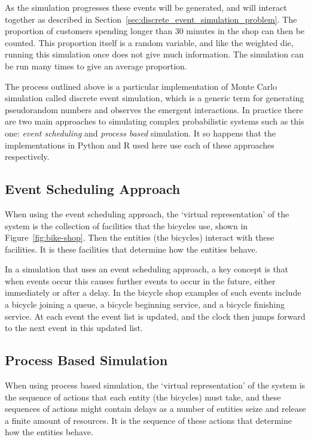 As the simulation progresses these events will be generated, and will interact
together as described in Section~\ref{sec:discrete_event_simulation_problem}.
The proportion of customers spending longer than 30 minutes in the shop can then
be counted. This proportion itself is a random variable, and like the
weighted die, running this simulation once does not give much information.
The simulation can be run many times to give an average proportion.

The process outlined above is a particular implementation of Monte Carlo
simulation called discrete event simulation, which is a generic term
for generating pseudorandom numbers and observes the emergent interactions. In
practice there are two main approaches to simulating complex probabilistic
systems such as this one: \textit{event scheduling} and
\textit{process based} simulation.  It so happens that the
implementations in Python and R used here use each of these approaches respectively.

\subsection{Event Scheduling Approach}

When using the event scheduling approach, the `virtual representation' of the
system is the collection of facilities that the bicycles use, shown in
Figure~\ref{fig:bike-shop}. Then the entities (the bicycles) interact with these
facilities. It is these facilities that determine how the entities behave.

In a simulation that uses an event scheduling approach, a key concept is that
when events occur this causes further events to occur in the future, either
immediately or after a delay.
In the bicycle shop examples of such events include a bicycle joining a queue, a
bicycle beginning service, and a bicycle finishing service. At each event the
event list is updated, and the clock then jumps forward to the next event in
this updated list.

\subsection{Process Based Simulation}

When using process based simulation, the `virtual
representation' of the system is the sequence of actions that each entity
(the bicycles) must take, and these sequences of actions might contain delays as
a number of entities seize and release a finite amount of resources. It is the
sequence of these actions that determine how the entities behave.

